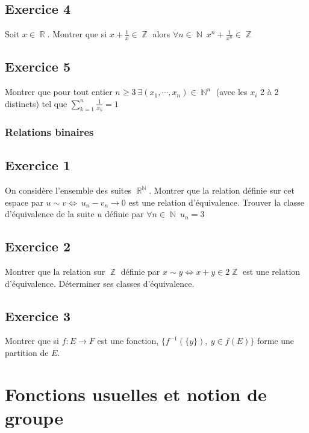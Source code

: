 \documentclass{article}
\DeclareMathOperator{\R}{\mathbb{R}}
\DeclareMathOperator{\Z}{\mathbb{Z}}
\DeclareMathOperator{\N}{\mathbb{N}}
\begin{document}
\subsection*{Exercice 4} 

Soit $x \in \R$. Montrer que si $x + \displaystyle\frac{1}{x} \in \Z$ alors $\forall n\in \N \
x^n + \displaystyle\frac{1}{x^n} \in \Z$ 

\subsection*{Exercice 5} 

Montrer que pour tout entier $n\geqslant 3 \ \exists (x_1, \cdots, x_n) \in \N^n$ (avec les $x_i$ 2 à 2 distincts) tel que $\displaystyle\sum_{k=1}^n{\frac{1}{x_k}} = 1$ 

\subsubsection{Relations binaires}

\subsection*{Exercice 1} 

On considère l'ensemble des suites $\R^{\N}$. Montrer que la relation définie sur cet espace par $u \sim v \Leftrightarrow \  u_n - v_n \longrightarrow 0$ est une relation d'équivalence. Trouver la classe d'équivalence de la suite $u$ définie par $\forall n\in \N \ u_n = 3 $ 

\subsection*{Exercice 2} 

Montrer que la relation sur $\Z$ définie par $x\sim y \Leftrightarrow x+y \in 2\Z$ est une relation d'équivalence. Déterminer ses classes d'équivalence. 

\subsection*{Exercice 3} 

Montrer que si $f : E \to F$ est une fonction, $\{f^{-1}(\{y\}), \ y\in f(E)\}$ forme une partition de $E$. 

\clearpage

\section{Fonctions usuelles et notion de groupe}
\end{document}
